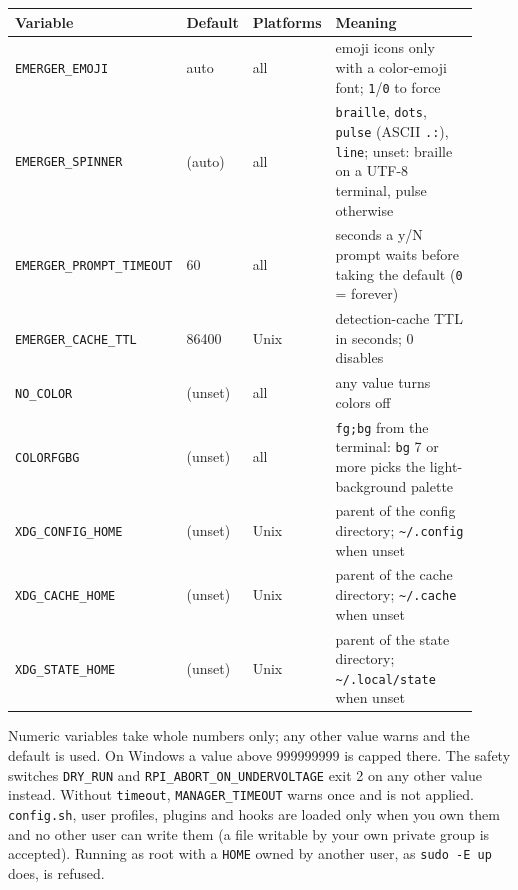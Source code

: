 \documentclass[11pt,a4paper]{article}
\begin{document}
\begin{center}
\begin{longtable}{@{}p{0.34\linewidth} p{0.12\linewidth} p{0.12\linewidth} p{0.34\linewidth}@{}}
\toprule
\textbf{Variable} & \textbf{Default} & \textbf{Platforms} & \textbf{Meaning} \\
\midrule \endhead
\texttt{EMERGER\_EMOJI}              & auto     & all  & emoji icons only with a color-emoji font; \texttt{1}/\texttt{0} to force \\
\texttt{EMERGER\_SPINNER}            & (auto)   & all  & \texttt{braille}, \texttt{dots}, \texttt{pulse} (ASCII \texttt{.:}), \texttt{line}; unset: braille on a UTF-8 terminal, pulse otherwise \\
\texttt{EMERGER\_PROMPT\_TIMEOUT}    & 60       & all  & seconds a y/N prompt waits before taking the default (\texttt{0} = forever) \\
\texttt{EMERGER\_CACHE\_TTL}         & 86400    & Unix & detection-cache TTL in seconds; 0 disables \\
\texttt{NO\_COLOR}                   & (unset)  & all  & any value turns colors off \\
\texttt{COLORFGBG}                   & (unset)  & all  & \texttt{fg;bg} from the terminal: \texttt{bg} 7 or more picks the light-background palette \\
\texttt{XDG\_CONFIG\_HOME}           & (unset) & Unix & parent of the config directory; \verb|~/.config| when unset \\
\texttt{XDG\_CACHE\_HOME}            & (unset) & Unix & parent of the cache directory; \verb|~/.cache| when unset \\
\texttt{XDG\_STATE\_HOME}            & (unset) & Unix & parent of the state directory; \verb|~/.local/state| when unset \\
\bottomrule
\end{longtable}
\end{center}

Numeric variables take whole numbers only; any other value warns and the
default is used. On Windows a value above 999999999 is capped there. The
safety switches \verb|DRY_RUN| and \verb|RPI_ABORT_ON_UNDERVOLTAGE| exit 2
on any other value instead. Without \texttt{timeout}, \verb|MANAGER_TIMEOUT|
warns once and is not applied. \texttt{config.sh}, user profiles, plugins
and hooks are loaded only when you own them and no other user can write
them (a file writable by your own private group is accepted). Running as
root with a \texttt{HOME} owned by another user, as \verb|sudo -E up| does,
is refused.
\end{document}
